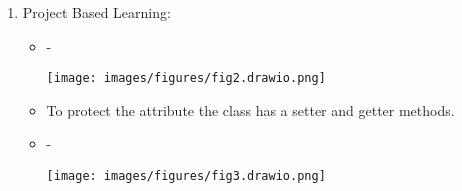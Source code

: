 \documentclass[12pt,titlepage]{article}
\begin{document}
\begin{enumerate}
\begin{itemize}
    \end{itemize}
    \newpage
    \item Project Based Learning:
    \begin{itemize}
        \item -
        \begin{center}
            \texttt{[image: images/figures/fig2.drawio.png]}
        \end{center}
        \item To protect the attribute the class has a setter and getter methods.
        \item -
        \begin{center}
            \texttt{[image: images/figures/fig3.drawio.png]}
        \end{center}
    \end{itemize}
\end{enumerate}
\end{document}
